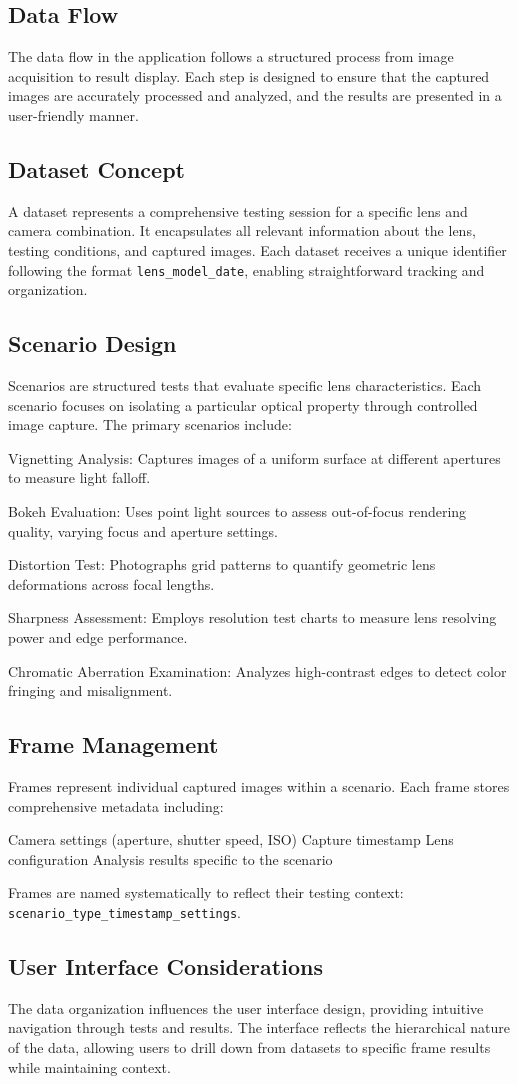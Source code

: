 \subsection{Data Flow}
The data flow in the application follows a structured process from image acquisition to result display. Each step is designed to ensure that the captured images are accurately processed and analyzed, and the results are presented in a user-friendly manner.

\subsection{Dataset Concept}
A dataset represents a comprehensive testing session for a specific lens and camera combination. It encapsulates all relevant information about the lens, testing conditions, and captured images. Each dataset receives a unique identifier following the format \texttt{lens\_model\_date}, enabling straightforward tracking and organization.

\subsection{Scenario Design}
Scenarios are structured tests that evaluate specific lens characteristics. Each scenario focuses on isolating a particular optical property through controlled image capture. The primary scenarios include:

Vignetting Analysis: Captures images of a uniform surface at different apertures to measure light falloff.

Bokeh Evaluation: Uses point light sources to assess out-of-focus rendering quality, varying focus and aperture settings.

Distortion Test: Photographs grid patterns to quantify geometric lens deformations across focal lengths.

Sharpness Assessment: Employs resolution test charts to measure lens resolving power and edge performance.

Chromatic Aberration Examination: Analyzes high-contrast edges to detect color fringing and misalignment.

\subsection{Frame Management}
Frames represent individual captured images within a scenario. Each frame stores comprehensive metadata including:

Camera settings (aperture, shutter speed, ISO)
Capture timestamp
Lens configuration
Analysis results specific to the scenario

Frames are named systematically to reflect their testing context: \texttt{scenario\_type\_timestamp\_settings}.

\subsection{User Interface Considerations}
The data organization influences the user interface design, providing intuitive navigation through tests and results. The interface reflects the hierarchical nature of the data, allowing users to drill down from datasets to specific frame results while maintaining context.